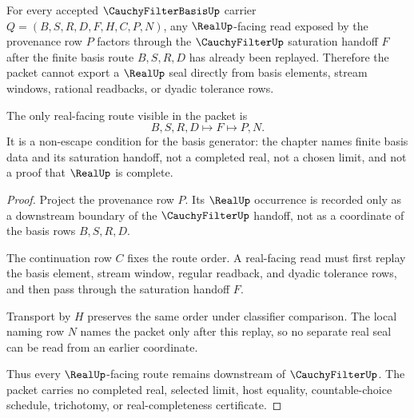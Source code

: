 \begin{theorem}
\label{thm:cauchy-filter-basis-real-seal-nonescape}
For every accepted $\CauchyFilterBasisUp$ carrier $Q=(B,S,R,D,F,H,C,P,N)$, any $\RealUp$-facing read exposed by the provenance row $P$ factors through the $\CauchyFilterUp$ saturation handoff $F$ after the finite basis route $B,S,R,D$ has already been replayed. Therefore the packet cannot export a $\RealUp$ seal directly from basis elements, stream windows, rational readbacks, or dyadic tolerance rows.

The only real-facing route visible in the packet is
$$
B,S,R,D \longmapsto F \longmapsto P,N .
$$
It is a non-escape condition for the basis generator: the chapter names finite basis data and its saturation handoff, not a completed real, not a chosen limit, and not a proof that $\RealUp$ is complete.
\end{theorem}
\begin{proof}
Project the provenance row $P$. Its $\RealUp$ occurrence is recorded only as a downstream boundary of the $\CauchyFilterUp$ handoff, not as a coordinate of the basis rows $B,S,R,D$.

The continuation row $C$ fixes the route order. A real-facing read must first replay the basis element, stream window, regular readback, and dyadic tolerance rows, and then pass through the saturation handoff $F$.

Transport by $H$ preserves the same order under classifier comparison. The local naming row $N$ names the packet only after this replay, so no separate real seal can be read from an earlier coordinate.

Thus every $\RealUp$-facing route remains downstream of $\CauchyFilterUp$. The packet carries no completed real, selected limit, host equality, countable-choice schedule, trichotomy, or real-completeness certificate.
\end{proof}

\begin{closurestatus}{\CauchyFilterBasisUp}
  \theoryclosure{\seedClosure}
  \formalstatus{\unformalizedV}
\end{closurestatus}

